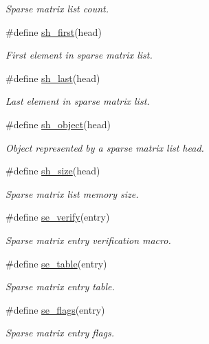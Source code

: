 \begin{CompactItemize}
\begin{CompactList}\small\item\em Sparse matrix list count.\item\end{CompactList}\item 
\#define \hyperlink{group__dbprim__smat_a34}{sh\_\-first}(head)
\begin{CompactList}\small\item\em First element in sparse matrix list.\item\end{CompactList}\item 
\#define \hyperlink{group__dbprim__smat_a35}{sh\_\-last}(head)
\begin{CompactList}\small\item\em Last element in sparse matrix list.\item\end{CompactList}\item 
\#define \hyperlink{group__dbprim__smat_a36}{sh\_\-object}(head)
\begin{CompactList}\small\item\em Object represented by a sparse matrix list head.\item\end{CompactList}\item 
\#define \hyperlink{group__dbprim__smat_a37}{sh\_\-size}(head)
\begin{CompactList}\small\item\em Sparse matrix list memory size.\item\end{CompactList}\item 
\#define \hyperlink{group__dbprim__smat_a38}{se\_\-verify}(entry)
\begin{CompactList}\small\item\em Sparse matrix entry verification macro.\item\end{CompactList}\item 
\#define \hyperlink{group__dbprim__smat_a39}{se\_\-table}(entry)
\begin{CompactList}\small\item\em Sparse matrix entry table.\item\end{CompactList}\item 
\#define \hyperlink{group__dbprim__smat_a41}{se\_\-flags}(entry)
\begin{CompactList}\small\item\em Sparse matrix entry flags.\item\end{CompactList}\item 

\end{CompactItemize}
